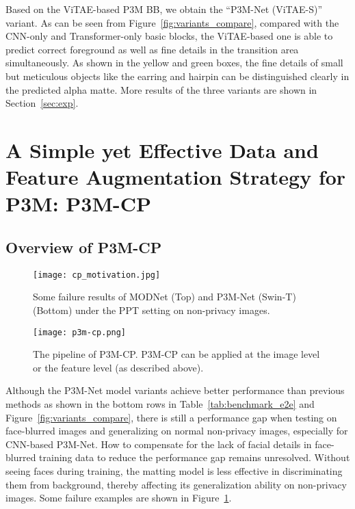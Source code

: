\documentclass[twocolumn]{svjour3}
\begin{document}
Based on the ViTAE-based P3M BB, we obtain the ``P3M-Net (ViTAE-S)'' variant. As can be seen from Figure~\ref{fig:variants_compare}, compared with the CNN-only and Transformer-only basic blocks, the ViTAE-based one is able to predict correct foreground as well as fine details in the transition area simultaneously. As shown in the yellow and green boxes, the fine details of small but meticulous objects like the earring and hairpin can be distinguished clearly in the predicted alpha matte. More results of the three variants are shown in Section~\ref{sec:exp}.




\section{A Simple yet Effective Data and Feature Augmentation Strategy for P3M: P3M-CP}\label{sec:p3mcp}

\subsection{Overview of P3M-CP}

\begin{figure}
    \centering
    \texttt{[image: cp\_motivation.jpg]}
    \caption{Some failure results of MODNet (Top) and P3M-Net (Swin-T) (Bottom) under the PPT setting on non-privacy images.}
    \label{fig:p3m-cp-motivation}
\end{figure}

\begin{figure*}
    \centering
    \texttt{[image: p3m-cp.png]}
    \caption{The pipeline of P3M-CP. P3M-CP can be applied at the image level or the feature level (as described above).}
    \label{fig:p3m-cp}
\end{figure*}


Although the P3M-Net model variants achieve better performance than previous methods as shown in the bottom rows in Table~\ref{tab:benchmark_e2e} and Figure~\ref{fig:variants_compare}, there is still a performance gap when testing on face-blurred images and generalizing on normal non-privacy images, especially for CNN-based P3M-Net. How to compensate for the lack of facial details in face-blurred training data to reduce the performance gap remains unresolved. Without seeing faces during training, the matting model is less effective in discriminating them from background, thereby affecting its generalization ability on non-privacy images. Some failure examples are shown in Figure~\ref{fig:p3m-cp-motivation}. 
\end{document}

